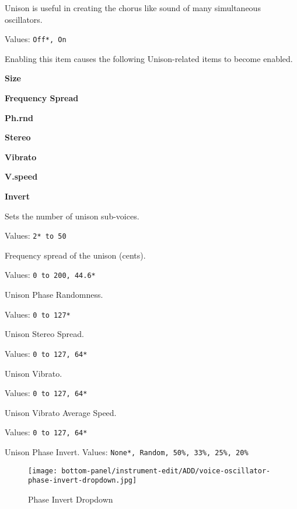    Unison is useful in creating the chorus like sound of many simultaneous
   oscillators.

   Values: \texttt{Off*, On}

   Enabling this item causes the following Unison-related items to become
   enabled.

      \begin{enumber}
         \item \textbf{Size}
         \item \textbf{Frequency Spread}
         \item \textbf{Ph.rnd}
         \item \textbf{Stereo}
         \item \textbf{Vibrato}
         \item \textbf{V.speed}
         \item \textbf{Invert}
      \end{enumber}

   \setcounter{ItemCounter}{0}      %

   Sets the number of unison sub-voices.

   Values: \texttt{2* to 50}

   Frequency spread of the unison (cents).

   Values: \texttt{0 to 200, 44.6*}

   Unison Phase Randomness.

   Values: \texttt{0 to 127*}

   Unison Stereo Spread.

   Values: \texttt{0 to 127, 64*}

   Unison Vibrato.

   Values: \texttt{0 to 127, 64*}

   Unison Vibrato Average Speed.

   Values: \texttt{0 to 127, 64*}

   Unison Phase Invert.
   Values: \texttt{None*, Random, 50\%, 33\%, 25\%, 20\%}

\begin{figure}[H]
   \centering 
   \texttt{[image: bottom-panel/instrument-edit/ADD/voice-oscillator-phase-invert-dropdown.jpg]}
   \caption{Phase Invert Dropdown}
   \label{fig:phase_invert_dropdown}
\end{figure}

